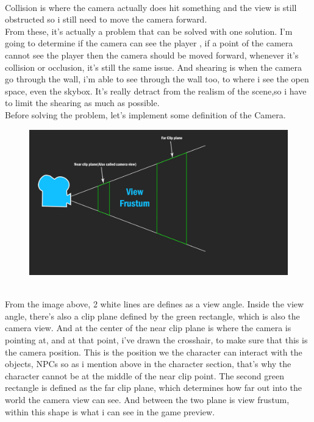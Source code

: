 \documentclass[a4paper, 13pt]{extarticle}
\begin{document}
 \\[0.05cm]
  Collision is where the camera actually does hit something and the view is still obstructed so i still need to move the camera forward. 
  \\[0.05cm] From these, it's actually a problem that can be solved with one solution. I'm going to determine if the camera can see the player , if a point of the camera cannot see the player then the camera should be moved forward, whenever it's collision or occlusion, it's still the same issue. And shearing is when the camera go through the wall, i'm able to see through the wall too, to where i see the open space, even the skybox. It's really detract from the realism of the scene,so i have to limit the shearing as much as possible.  	
  \\[0.15cm]
  Before solving the problem, let's implement some definition of the Camera.
  \begin{figure}[h]
  	\centering
  	\begin{minipage}{.4\textwidth}
  		\centering
  		\includegraphics[width=1.7\linewidth]{intructions/Camera_overview.png}
  		\centering
  		\label{fig:test12}
  	\end{minipage}
  \end{figure} 
\\[0.05cm]
From the image above, 2 white lines are defines as a view angle. Inside the view angle, there's also a clip plane defined by the green rectangle, which is also the camera view. And at the center of the near clip plane is where the camera is pointing at, and at that point, i've drawn the crosshair, to make sure that this is the camera position. This is the position we the character can interact with the objects, NPCs so as i mention above in the character section, that's why the character cannot be at the middle of the near clip point. The second green rectangle is defined as the far clip plane, which determines how far out into the world the camera view can see. And between the two plane is view frustum, within this shape is what i can see in the game preview.
\end{document}

